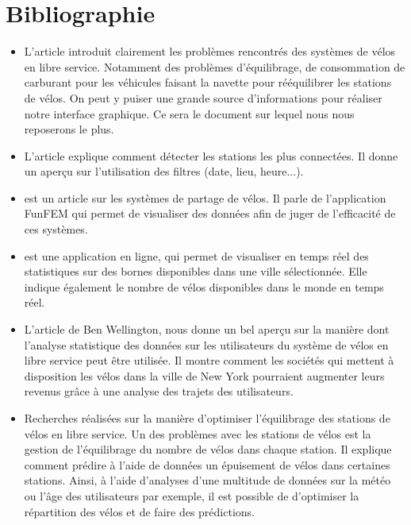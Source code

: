 \documentclass[12pt]{article}
\begin{document}
	\section{Bibliographie}
		\begin{itemize}
			\item L'article \cite{Oli16} introduit clairement les problèmes rencontrés
			des systèmes de vélos en libre service. Notamment des problèmes d'équilibrage,
			de consommation de carburant pour les véhicules faisant la navette pour
			rééquilibrer les stations de vélos. On peut y puiser une grande source
			d'informations pour réaliser notre interface graphique. Ce sera le document sur
			lequel nous nous reposerons le plus.

			\item L'article \cite{Ali14} explique comment détecter les stations les plus
			connectées. Il donne un aperçu sur  l'utilisation des filtres (date, lieu, heure...).

			\item \cite{BC16} est un article sur les systèmes de partage de vélos. Il parle
			de l'application FunFEM qui permet de visualiser des données afin de juger de
			l'efficacité de ces systèmes.

			\item \cite{BSM17} est une application en ligne, qui permet de visualiser en
			temps réel des statistiques sur des bornes disponibles dans une ville
			sélectionnée.  Elle indique également le nombre de vélos disponibles dans le
			monde en temps réel.

			\item L'article \cite{BW} de Ben Wellington, nous donne un bel aperçu sur la
			manière dont l'analyse statistique des données sur les utilisateurs du système de
			vélos en libre service peut être utilisée. Il montre comment les sociétés qui
			mettent à disposition les vélos dans la ville de New York pourraient augmenter
			leurs revenus grâce à une analyse des trajets des utilisateurs.

			\item \cite{JL} Recherches réalisées sur la manière d'optimiser l'équilibrage
			des stations de vélos en libre service. Un des problèmes avec les stations de vélos
			est la gestion de l'équilibrage du nombre de  vélos dans chaque station. Il explique
			comment prédire à l'aide de données un épuisement de vélos dans certaines stations.
			Ainsi, à l'aide d'analyses d'une multitude de données sur la météo ou l'âge des
			utilisateurs par exemple, il est possible de d'optimiser la répartition des vélos et
			de faire des prédictions.


\end{itemize}
\end{document}
